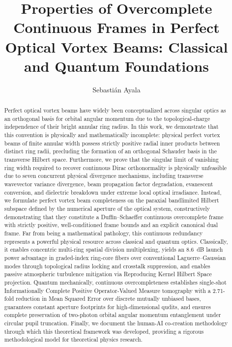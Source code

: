 \documentclass{optica-article}
\begin{document}
\title{Properties of Overcomplete Continuous Frames in Perfect Optical Vortex Beams: Classical and Quantum Foundations}

\author{Sebastián Ayala}

\address{Investigador Independiente, Cauquenes, Región del Maule, Chile}



\begin{abstract}
Perfect optical vortex beams have widely been conceptualized across singular optics as an orthogonal basis for orbital angular momentum due to the topological-charge independence of their bright annular ring radius. In this work, we demonstrate that this convention is physically and mathematically incomplete: physical perfect vortex beams of finite annular width possess strictly positive radial inner products between distinct ring radii, precluding the formation of an orthogonal Schauder basis in the transverse Hilbert space. Furthermore, we prove that the singular limit of vanishing ring width required to recover continuous Dirac orthonormality is physically unfeasible due to seven concurrent physical divergence mechanisms, including transverse wavevector variance divergence, beam propagation factor degradation, evanescent conversion, and dielectric breakdown under extreme local optical irradiance. Instead, we formulate perfect vortex beam completeness on the paraxial bandlimited Hilbert subspace defined by the numerical aperture of the optical system, constructively demonstrating that they constitute a Duffin--Schaeffer continuous overcomplete frame with strictly positive, well-conditioned frame bounds and an explicit canonical dual frame. Far from being a mathematical pathology, this continuous redundancy represents a powerful physical resource across classical and quantum optics. Classically, it enables concentric multi-ring spatial division multiplexing, yields an 8.6~dB launch power advantage in graded-index ring-core fibers over conventional Laguerre--Gaussian modes through topological radius locking and crosstalk suppression, and enables passive atmospheric turbulence mitigation via Reproducing Kernel Hilbert Space projection. Quantum mechanically, continuous overcompleteness establishes single-shot Informationally Complete Positive Operator-Valued Measure tomography with a 2.71-fold reduction in Mean Squared Error over discrete mutually unbiased bases, guarantees constant aperture footprints for high-dimensional qudits, and ensures complete preservation of two-photon orbital angular momentum entanglement under circular pupil truncation. Finally, we document the human-AI co-creation methodology through which this theoretical framework was developed, providing a rigorous methodological model for theoretical physics research.
\end{abstract}
\end{document}
